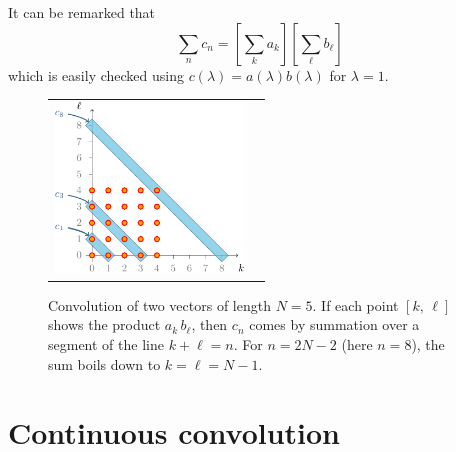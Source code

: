 \documentclass[11pt,a4paper]{report}\usepackage[]{graphicx}\usepackage[]{color}
\begin{document}
It can be remarked that 
$$
    \sum_{n} c_n = \left[\sum_{k} a_k \right]
    \left[\sum_{\ell} b_\ell \right]
$$
which is easily checked using  $c(\lambda) = a(\lambda)b(\lambda)$ for $\lambda=1$.

\begin{figure}
   \centering
   \begin{tabular}{c c} 
     \includegraphics[width=5cm]{images/Convol.pdf} &
   \end{tabular}
   \caption{\label{FIGCONV} Convolution of two vectors of length $N=5$.
    If each point $[k,\,\ell]$ shows the product  $a_k\,b_\ell$, 
    then $c_n$ comes by summation over a segment of the line $k+\ell =n$. 
    For $n=2N-2$ (here $n=8$), the sum boils down to $k=\ell=N-1$.}
\end{figure}

\section{Continuous convolution}
\end{document}
